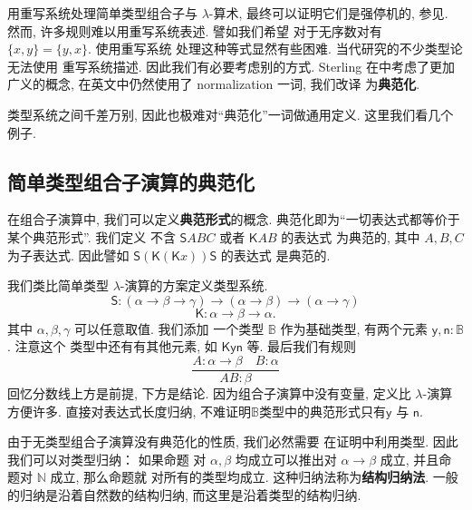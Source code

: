 \documentclass[UTF8]{ctexbook}
\newcommand{\cons}[1]{\textsf{#1}}
\theoremstyle{plain}
\theoremstyle{definition}
\theoremstyle{remark}
\begin{document}
用重写系统处理简单类型组合子与 \(\lambda\)-算术,
最终可以证明它们是强停机的, 参见\cite{loader:1998:stlc}.
然而, 许多规则难以用重写系统表述. 譬如我们希望
对于无序数对有 \(\{x,y\} = \{y,x\}\). 使用重写系统
处理这种等式显然有些困难. 当代研究的不少类型论无法使用
重写系统描述. 因此我们有必要考虑别的方式. Sterling
在\cite{sterling:2021:thesis}中考虑了更加广义的概念,
在英文中仍然使用了 normalization 一词, 我们改译
为\textbf{典范化}.

类型系统之间千差万别, 因此也极难对“典范化”一词做通用定义.
这里我们看几个例子.

\subsection{简单类型组合子演算的典范化}
在组合子演算中, 我们可以定义\textbf{典范形式}的概念.
典范化即为“一切表达式都等价于某个典范形式”. 我们定义
不含 \(\cons{S}ABC\) 或者 \(\cons{K}AB\) 的表达式
为典范的, 其中 \(A,B,C\) 为子表达式. 因此譬如
\(\cons{S}(\cons{K}(\cons{K}x))\cons{S}\) 的表达式
是典范的.

我们类比简单类型 \(\lambda\)-演算的方案定义类型系统.
\[\cons{S} : (\alpha \to \beta \to \gamma)
\to (\alpha \to \beta) \to (\alpha \to \gamma)\]
\[\cons{K} : \alpha \to \beta \to \alpha.\]
其中 \(\alpha,\beta,\gamma\) 可以任意取值. 我们添加
一个类型 \(\mathbb B\) 作为基础类型, 有两个元素
\(\cons{y}, \cons{n} : \mathbb B\). 注意这个
类型中还有有其他元素, 如 \(\cons{K}\cons{y}\cons{n}\) 等.
最后我们有规则
\[\frac{A : \alpha \to \beta \quad B : \alpha}{AB : \beta}\]
回忆分数线上方是前提, 下方是结论. 因为组合子演算中没有变量,
定义比 \(\lambda\)-演算方便许多. 直接对表达式长度归纳,
不难证明\(\mathbb B\)类型中的典范形式只有\(\cons{y}\)
与 \(\cons{n}\).

由于无类型组合子演算没有典范化的性质, 我们必然需要
在证明中利用类型. 因此我们可以对类型归纳： 如果命题
对 \(\alpha,\beta\) 均成立可以推出对 \(\alpha\to\beta\)
成立, 并且命题对 \(\mathbb N\) 成立, 那么命题就
对所有的类型均成立. 这种归纳法称为\textbf{结构归纳法}.
一般的归纳是沿着自然数的结构归纳, 而这里是沿着类型的结构归纳.
\end{document}
